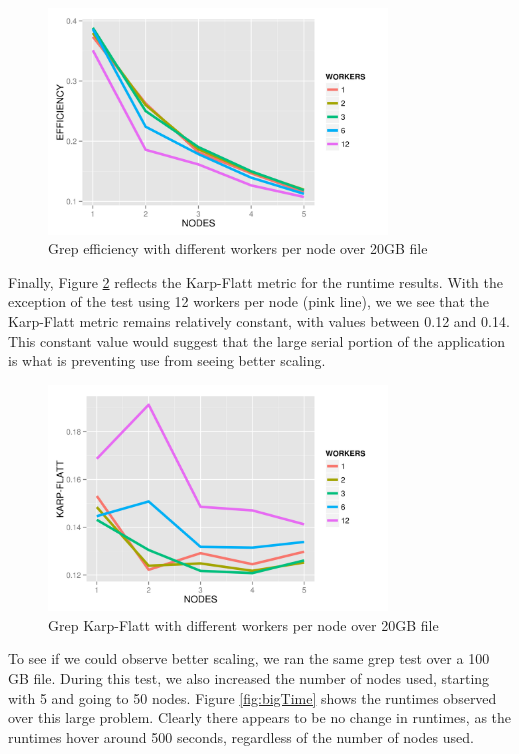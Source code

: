 \documentclass{article}
\begin{document}
    \begin{figure}[H]
        \centering
        \includegraphics[width=90mm]{images/workerPerNodeEfficiency.png}
        \caption{Grep efficiency with different workers per node over 20GB file}
        \label{fig:workNodeEff}
    \end{figure}

Finally, Figure \ref{fig:workNodeKF} reflects the Karp-Flatt metric for the
runtime results. With the exception of the test using 12 workers per node (pink
line), we we see that the Karp-Flatt metric remains relatively constant, with
values between 0.12 and 0.14. This constant value would suggest that the
large serial portion of the application is what is preventing use from seeing
better scaling.

    \begin{figure}[H]
        \centering
        \includegraphics[width=90mm]{images/workerPerNodeKarpFlatt.png}
        \caption{Grep Karp-Flatt with different workers per node over 20GB file}
        \label{fig:workNodeKF}
    \end{figure}

To see if we could observe better scaling, we ran the same grep test over a
100 GB file. During this test, we also increased the number of nodes used,
starting with 5 and going to 50 nodes. Figure \ref{fig:bigTime} shows the
runtimes observed over this large problem.  Clearly there appears to be no
change in runtimes, as the runtimes hover around 500 seconds, regardless of the
number of nodes used.
\end{document}
